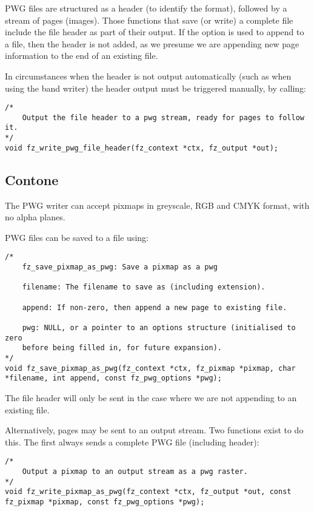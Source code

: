 \documentclass[oneside]{book}
\begin{document}
PWG files are structured as a header (to identify the format), followed by a stream of pages (images). Those functions that save (or write) a complete file include the file header as part of their output. If the option is used to append to a file, then the header is not added, as we presume we are appending new page information to the end of an existing file.

In circumstances when the header is not output automatically (such as when using the band writer) the header output must be triggered manually, by calling:

\begin{lstlisting}
/*
	Output the file header to a pwg stream, ready for pages to follow it.
*/
void fz_write_pwg_file_header(fz_context *ctx, fz_output *out);
\end{lstlisting}

\subsection{Contone}

The PWG writer can accept pixmaps in greyscale, RGB and CMYK format, with no alpha planes.

PWG files can be saved to a file using:

\begin{lstlisting}
/*
	fz_save_pixmap_as_pwg: Save a pixmap as a pwg

	filename: The filename to save as (including extension).

	append: If non-zero, then append a new page to existing file.

	pwg: NULL, or a pointer to an options structure (initialised to zero
	before being filled in, for future expansion).
*/
void fz_save_pixmap_as_pwg(fz_context *ctx, fz_pixmap *pixmap, char *filename, int append, const fz_pwg_options *pwg);
\end{lstlisting}

The file header will only be sent in the case where we are not appending to an existing file.

Alternatively, pages may be sent to an output stream. Two functions exist to do this. The first always sends a complete PWG file (including header):

\begin{lstlisting}
/*
	Output a pixmap to an output stream as a pwg raster.
*/
void fz_write_pixmap_as_pwg(fz_context *ctx, fz_output *out, const fz_pixmap *pixmap, const fz_pwg_options *pwg);
\end{lstlisting}
\end{document}
